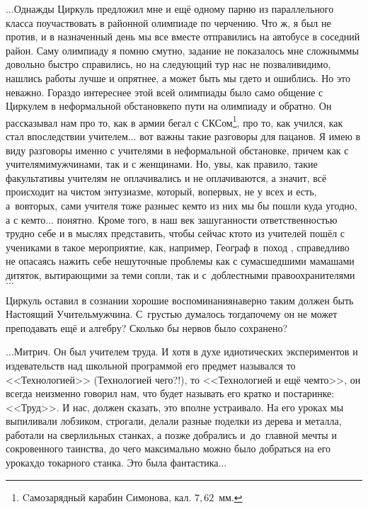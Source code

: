 $\ldots$Однажды Циркуль предложил мне и ещё одному парню из параллельного класса поучаствовать в районной олимпиаде по черчению. Что ж, я был не против, и в назначенный день мы все вместе отправились на автобусе в соседний район. Саму олимпиаду я помню смутно, задание не показалось мне сложным\mdash мы довольно быстро справились, но на следующий тур нас не позвали\mdash видимо, нашлись работы лучше и опрятнее, а может быть мы где\sdash то и ошиблись. Но это неважно. Гораздо интереснее этой всей олимпиады было само общение с Циркулем в неформальной обстановке\mdash по пути на олимпиаду и обратно. Он рассказывал нам про то, как в армии бегал с СКС\sdash ом\footnote{Cамозарядный карабин Симонова, кал. $7,62$~мм.}, про то, как учился, как стал впоследствии учителем$\ldots$ вот важны такие разговоры для пацанов. Я имею в виду разговоры именно с учителями в неформальной обстановке, причем как с учителями\sdash мужчинами, так и с женщинами. Но, увы, как правило, такие факультативы учителям не оплачивались и не оплачиваются, а значит, всё происходит на чистом энтузиазме, который, во\sdash первых, не у всех и есть, а~во\sdash вторых, сами учителя тоже разные\mdash с кем\sdash то из них мы бы пошли куда угодно, а с кем\sdash то$\ldots$ понятно. Кроме того, в наш век зашуганности ответственностью трудно себе и в мыслях представить, чтобы сейчас кто\sdash то из учителей пошёл с учениками в такое мероприятие, как, например, Географ в~поход \cite{ГеографГлобусПропил}, справедливо не опасаясь нажить себе нешуточные проблемы как с сумасшедшими мамашами дитяток, вытирающими за теми сопли, так и с~доблестными правоохранителями$\ldots$

Циркуль оставил в сознании хорошие воспоминания\mdash наверно таким должен быть Настоящий Учитель\sdash мужчина. С~грустью думалось тогда\mdash почему он не может преподавать ещё и алгебру? Сколько бы нервов было сохранено?
%
%
%
%
%



\vspace{1.0cm}
$\ldots$Митрич. Он был учителем труда. И хотя в духе идиотических экспериментов и издевательств над школьной программой его предмет назывался то <<Технологией>> (Технологией чего?!), то <<Технологией и ещё чем\sdash то>>, он всегда неизменно говорил нам, что будет называть его кратко и по\sdash старинке: <<Труд>>. И нас, должен сказать, это вполне устраивало. На его уроках мы выпиливали лобзиком, строгали, делали разные поделки из дерева и металла, работали на сверлильных станках, а позже добрались и~до~главной мечты и сокровенного таинства, до чего максимально можно было добраться на его уроках\mdash до токарного станка. Это была фантастика$\ldots$

